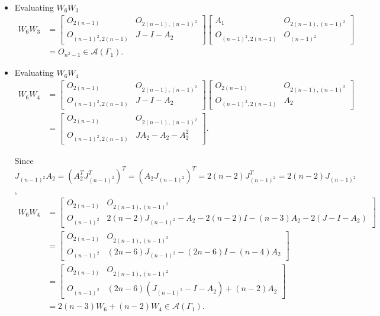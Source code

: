 \begin{itemize}
    \item Evaluating $W_6W_3$
    \begin{align*}
        W_6W_3
        &= \begin{bmatrix}
            O_{2(n-1)} & O_{2(n-1), (n-1)^2} \\
            O_{(n-1)^2, 2(n-1)} & J-I-A_2
        \end{bmatrix}\begin{bmatrix}
            A_1 & O_{2(n-1), (n-1)^2} \\
            O_{(n-1)^2, 2(n-1)} & O_{(n-1)^2}
        \end{bmatrix}\\
        &= O_{n^2-1}\in\mathcal{A}(\Gamma_1).
    \end{align*}
    
    \item Evaluating $W_6W_4$
    \begin{align*}
        W_6W_4
        &= \begin{bmatrix}
            O_{2(n-1)} & O_{2(n-1), (n-1)^2} \\
            O_{(n-1)^2, 2(n-1)} & J-I-A_2
        \end{bmatrix}\begin{bmatrix}
            O_{2(n-1)} & O_{2(n-1), (n-1)^2} \\
            O_{(n-1)^2, 2(n-1)} & A_2
        \end{bmatrix}\\
        &= \begin{bmatrix}
            O_{2(n-1)} & O_{2(n-1), (n-1)^2} \\
            O_{(n-1)^2, 2(n-1)} & JA_2-A_2-A_2^2
        \end{bmatrix}.
    \end{align*}

    Since $J_{(n-1)^2}A_2 = (A_2^TJ^T_{(n-1)^2})^T = (A_2J_{(n-1)^2})^T = 2(n-2)J_{(n-1)^2}^T = 2(n-2)J_{(n-1)^2}$,
    \begin{align*}
        W_6W_4
        &= \begin{bmatrix}
            O_{2(n-1)} & O_{2(n-1), (n-1)^2} \\
            O_{(n-1)^2} & 2(n-2)J_{(n-1)^2}-A_2-2(n-2)I-(n-3)A_2-2(J-I-A_2)
        \end{bmatrix}\\
        &= \begin{bmatrix}
            O_{2(n-1)} & O_{2(n-1), (n-1)^2} \\
            O_{(n-1)^2} & (2n-6)J_{(n-1)^2} - (2n-6)I - (n-4)A_2
        \end{bmatrix}\\
        &= \begin{bmatrix}
            O_{2(n-1)} & O_{2(n-1), (n-1)^2} \\
            O_{(n-1)^2} & (2n-6)(J_{(n-1)^2} -I - A_2) + (n-2)A_2 
        \end{bmatrix}\\
        &= 2(n-3)W_6 + (n-2)W_4\in\mathcal{A}(\Gamma_1).
    \end{align*}
    

\end{itemize}
